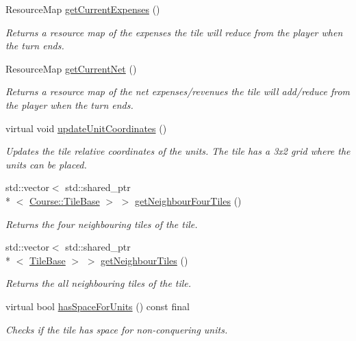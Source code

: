 \begin{DoxyCompactItemize}
Resource\-Map \hyperlink{class_course_1_1_tile_base_ac3c14047883c67ee39c9f04cb403e8f3}{get\-Current\-Expenses} ()
\begin{DoxyCompactList}\small\item\em Returns a resource map of the expenses the tile will reduce from the player when the turn ends. \end{DoxyCompactList}\item 
Resource\-Map \hyperlink{class_course_1_1_tile_base_aee1269b23b676b08a7ea21344ac514c7}{get\-Current\-Net} ()
\begin{DoxyCompactList}\small\item\em Returns a resource map of the net expenses/revenues the tile will add/reduce from the player when the turn ends. \end{DoxyCompactList}\item 
virtual void \hyperlink{class_course_1_1_tile_base_a161cb46028a65ca20ece683314a8fa46}{update\-Unit\-Coordinates} ()
\begin{DoxyCompactList}\small\item\em Updates the tile relative coordinates of the units. The tile has a 3x2 grid where the units can be placed. \end{DoxyCompactList}\item 
std\-::vector$<$ std\-::shared\-\_\-ptr\\*
$<$ \hyperlink{class_course_1_1_tile_base}{Course\-::\-Tile\-Base} $>$ $>$ \hyperlink{class_course_1_1_tile_base_a09aece148011f9fab23a5af25bf10a1c}{get\-Neighbour\-Four\-Tiles} ()
\begin{DoxyCompactList}\small\item\em Returns the four neighbouring tiles of the tile. \end{DoxyCompactList}\item 
std\-::vector$<$ std\-::shared\-\_\-ptr\\*
$<$ \hyperlink{class_course_1_1_tile_base}{Tile\-Base} $>$ $>$ \hyperlink{class_course_1_1_tile_base_afee4e55a484bcbbdb3544fca480bed2f}{get\-Neighbour\-Tiles} ()
\begin{DoxyCompactList}\small\item\em Returns the all neighbouring tiles of the tile. \end{DoxyCompactList}\item 
virtual bool \hyperlink{class_course_1_1_tile_base_a1033414247cce3b6c6894b787bdf2b64}{has\-Space\-For\-Units} () const final
\begin{DoxyCompactList}\small\item\em Checks if the tile has space for non-\/conquering units. \end{DoxyCompactList}\item 

\end{DoxyCompactItemize}

